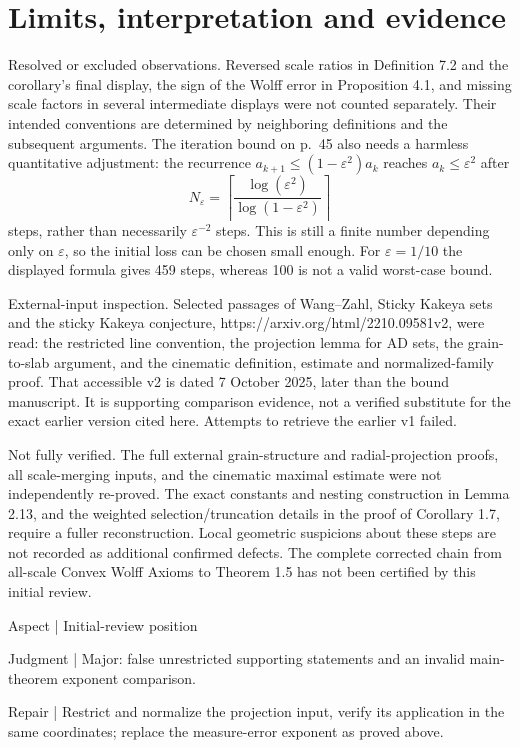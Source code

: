 \documentclass[10pt]{article}
\begin{document}
\section*{Limits, interpretation and evidence}
Resolved or excluded observations. Reversed scale ratios in Definition 7.2 and the corollary’s final display, the sign of the Wolff error in Proposition 4.1, and missing scale factors in several intermediate displays were not counted separately. Their intended conventions are determined by neighboring definitions and the subsequent arguments. The iteration bound on p. 45 also needs a harmless quantitative adjustment: the recurrence \(a_{k+1}\leq(1-\varepsilon^2)a_k\) reaches \(a_k\leq\varepsilon^2\) after \[N_\varepsilon=\left\lceil
 \frac{\log(\varepsilon^2)}{\log(1-\varepsilon^2)}
 \right\rceil\] steps, rather than necessarily \(\varepsilon^{-2}\) steps. This is still a finite number depending only on \(\varepsilon\), so the initial loss can be chosen small enough. For \(\varepsilon=1/10\) the displayed formula gives 459 steps, whereas 100 is not a valid worst-case bound.\par
External-input inspection. Selected passages of Wang–Zahl, Sticky Kakeya sets and the sticky Kakeya conjecture, https://arxiv.org/html/2210.09581v2, were read: the restricted line convention, the projection lemma for AD sets, the grain-to-slab argument, and the cinematic definition, estimate and normalized-family proof. That accessible v2 is dated 7 October 2025, later than the bound manuscript. It is supporting comparison evidence, not a verified substitute for the exact earlier version cited here. Attempts to retrieve the earlier v1 failed.\par
Not fully verified. The full external grain-structure and radial-projection proofs, all scale-merging inputs, and the cinematic maximal estimate were not independently re-proved. The exact constants and nesting construction in Lemma 2.13, and the weighted selection/truncation details in the proof of Corollary 1.7, require a fuller reconstruction. Local geometric suspicions about these steps are not recorded as additional confirmed defects. The complete corrected chain from all-scale Convex Wolff Axioms to Theorem 1.5 has not been certified by this initial review.\par
Aspect | Initial-review position\par
Judgment | Major: false unrestricted supporting statements and an invalid main-theorem exponent comparison.\par
Repair | Restrict and normalize the projection input, verify its application in the same coordinates; replace the measure-error exponent as proved above.\par
\end{document}

